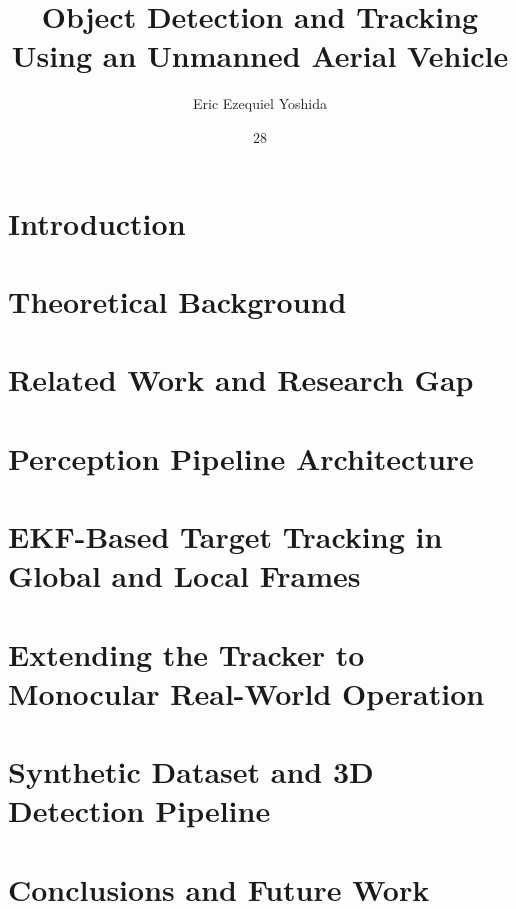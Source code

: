 \documentclass[msc, eng]{ita}    %
\author{Eric Ezequiel Yoshida}{de Lima}
\title{Object Detection and Tracking Using an Unmanned Aerial Vehicle}
\date{28}{July}{2026}                   %
\theoremstyle{remark}
\begin{document}


\mainmatter

\chapter{Introduction}


\chapter{Theoretical Background}\label{cha:background}


\chapter{Related Work and Research Gap}\label{cha:relatedwork}


\chapter{Perception Pipeline Architecture}\label{cha:pipeline}


\chapter{EKF-Based Target Tracking in Global and Local Frames}\label{cha:tracking}


\chapter{Extending the Tracker to Monocular Real-World Operation}\label{cha:monocular}


\chapter{Synthetic Dataset and 3D Detection Pipeline}\label{cha:airsim}


\chapter{Conclusions and Future Work}\label{cha:conclusions}


\renewcommand\bibname{\itareferencesnamebabel} %

\end{document}
